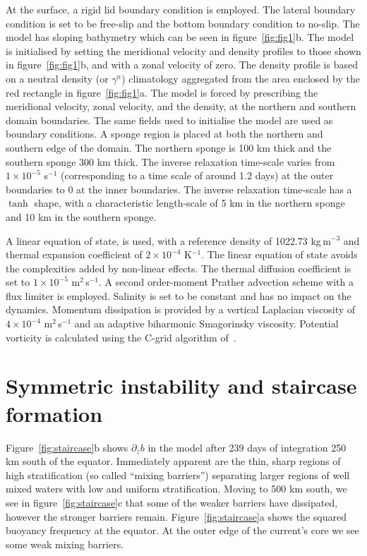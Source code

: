 At the surface, a rigid lid boundary condition is employed. The lateral boundary condition is set to be free-slip and the bottom boundary condition to no-slip. The model has sloping bathymetry which can be seen in figure~\ref{fig:fig1}b. The model is initialised by setting the meridional velocity and density profiles to those shown in figure~\ref{fig:fig1}b, and with a zonal velocity of zero. The density profile is based on a neutral density (or $\gamma^n$) climatology aggregated from the area enclosed by the red rectangle in figure~\ref{fig:fig1}a. The model is forced by prescribing the meridional velocity, zonal velocity, and the density, at the northern and southern domain boundaries. The same fields used to initialise the model are used as boundary conditions. A sponge region is placed at both the northern and southern edge of the domain. The northern sponge is 100 km thick and the southern sponge 300 km thick. The inverse relaxation time-scale varies from $1\times 10^{-5}$ s$^{-1}$ (corresponding to a time scale of around 1.2 days) at the outer boundaries to 0 at the inner boundaries. The inverse relaxation time-scale has a $\tanh$ shape, with a characteristic length-scale of 5 km in the northern sponge and 10 km in the southern sponge.

A linear equation of state, is used, with a reference density of 1022.73 kg\,m$^{-3}$ and thermal expansion coefficient of $2 \times 10^{-4}$ K$^{-1}$. The linear equation of state avoids the complexities added by non-linear effects. The thermal diffusion coefficient is set to $1 \times 10^{-5}$ m$^{2}$\,s$^{-1}$. A second order-moment Prather advection scheme with a flux limiter is employed. Salinity is set to be constant and has no impact on the dynamics. Momentum dissipation is provided by a vertical Laplacian viscosity of $4 \times 10^{-4}$ m$^{2}$\,s$^{-1}$ and an adaptive biharmonic Smagorinsky viscosity. Potential vorticity is calculated using the C-grid algorithm of~\citet{Morel2019}.

\section{Symmetric instability and staircase formation}
\label{sec:randd}
Figure~\ref{fig:staircase}b shows $\partial_z b$ in the model after 239 days of integration 250 km south of the equator. Immediately apparent are the thin, sharp regions of high stratification (so called ``mixing barriers'') separating larger regions of well mixed waters with low and uniform stratification. Moving to 500 km south, we see in figure~\ref{fig:staircase}c that some of the weaker barriers have dissipated, however the stronger barriers remain. Figure~\ref{fig:staircase}a shows the squared buoyancy frequency at the equator. At the outer edge of the current's core we  see some weak mixing barriers.

